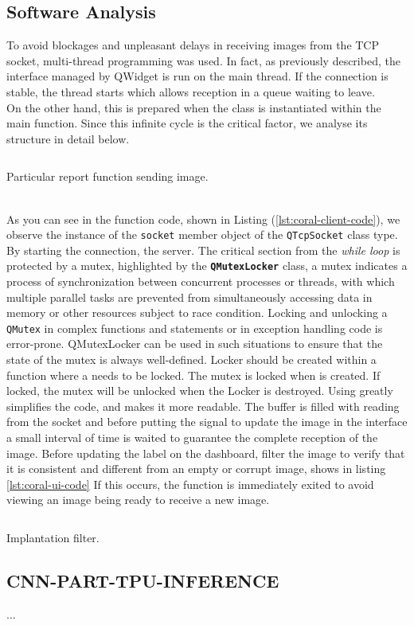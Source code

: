 \subsection{Software Analysis}
\label{ssec:software-coral-analysis}
To avoid blockages and unpleasant delays in receiving images from the TCP
socket, multi-thread programming was used. In fact, as previously described, the
interface managed by QWidget is run on the main thread. If the connection is
stable, the thread starts which allows reception in a queue waiting to leave.\\ 
On the other hand, this is prepared when the class is instantiated within the
main function. Since this infinite cycle is the critical factor, we analyse its
structure in detail below.
%
\begin{listing}[ht] 
\inputminted[bgcolor=bg,frame=lines,framesep=2mm, linenos=true, autogobble, breaklines=true, fontsize=\scriptsize, firstline=12, lastline=26]{c++}{software/code/streamerthread.cpp} 
\caption{Particular report function sending image.} 
\label{lst:coral-client-code} 
\end{listing}
%
\\As you can see in the function code, shown in Listing
(\ref{lst:coral-client-code}), we observe the instance of the \texttt{socket}
member object of the \tetxbf\texttt{{QTcpSocket}} class type. 
By starting the connection, the server. 
The critical section from the \emph{while loop} is protected by a mutex,
highlighted by the \textbf{\texttt{QMutexLocker}} class, a mutex indicates a
process of synchronization between concurrent processes or threads, with which
multiple parallel tasks are prevented from simultaneously accessing 
data in memory or other resources subject to race condition.\cite{wiki:mutex} 
Locking and unlocking a \texttt{QMutex} in complex functions and statements or
in exception handling code is error-prone. 
QMutexLocker can be used in such situations to ensure that the state of the
mutex is always well-defined.  Locker should be created within a
function where a  needs to be locked. The mutex is locked when
 is created. If locked, the mutex will be unlocked when
the  Locker is destroyed.
Using  greatly simplifies the code, and makes it more
readable.\cite{Qt:QMutexclass}
The buffer is filled with reading from the socket and before putting the signal
to update the image in the interface a small interval of time is waited to
guarantee the complete reception of the image.
Before updating the label on the dashboard, filter the image to verify that it
is consistent and different from an empty or corrupt image, shows in listing
\ref{lst:coral-ui-code} If this occurs, the function is immediately exited to
avoid viewing an image being ready to receive a new image. 
%
\begin{listing}[ht] 
\inputminted[bgcolor=bg,frame=lines,framesep=2mm, linenos=true, autogobble, breaklines=true, fontsize=\scriptsize, firstline=88, lastline=100]{c++}{software/code/tcpclient.cpp} 
\caption{Implantation filter.} 
\label{lst:coral-ui-code} 
\end{listing}
%
\subsection{CNN-PART-TPU-INFERENCE}
...
\newpage
